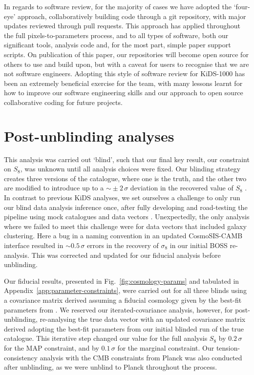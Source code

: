 \begin{appendix}
In regards to software review, for the majority of cases we have adopted the `four-eye' approach, collaboratively building code through a git repository, with major updates reviewed through pull requests.   This approach has applied throughout the full pixels-to-parameters process, and to all types of software, both our significant tools, analysis code and, for the most part, simple paper support scripts.  On publication of this paper, our repositories will become open source for others to use and build upon, but with a caveat for users to recognise that we are not software engineers.   Adopting this style of software review for KiDS-1000 has been an extremely beneficial exercise for the team, with many lessons learnt for how to improve our software engineering skills and our approach to open source collaborative coding for future projects.     

\section{Post-unblinding analyses}
\label{app:unblinding}
This analysis was carried out `blind',  such that our final key result, our constraint on $S_8$, was unknown until all analysis choices were fixed.   Our blinding strategy creates three versions of the catalogue, where one is the truth, and the other two are modified to introduce up to a $\sim\! \pm 2\,\sigma$ deviation in the recovered value of $S_8$ \citep{kuijken/etal:2015, giblin/etal:inprep}.   In contrast to previous KiDS analyses, we set ourselves a challenge to only run our blind data analysis inference once, after fully developing and road-testing the pipeline using mock catalogues and data vectors \citep{joachimi/etal:inprep}.     Unexpectedly, the only analysis where we failed to meet this challenge were for data vectors that included galaxy clustering.   Here a bug in a naming convention in an updated {\sc CosmoSIS-CAMB} interface resulted in $\sim\! 0.5\,\sigma$ errors in the recovery of $\sigma_8$ in our initial BOSS re-analysis.  This was corrected and updated for our fiducial analysis before unblinding.

Our fiducial results, presented in Fig.~\ref{fig:cosmology-params} and tabulated in Appendix~\ref{app:parameter-constraints}, were carried out for all three blinds using a covariance matrix derived assuming a fiducial cosmology given by the best-fit parameters from \citet{troester/etal:2020}.  We reserved our iterated-covariance analysis, however, for post-unblinding, re-analysing the true data vector with an updated covariance matrix derived adopting the best-fit parameters from our initial blinded run of the true catalogue.   This iterative step changed our value for the full \tttp analysis $S_8$ by $0.2\,\sigma$ for the MAP constraint, and by $0.1\, \sigma$ for the marginal constraint.   Our tension-consistency analysis with the CMB constraints from Planck was also conducted after unblinding, as we were unblind to Planck throughout the process.


\end{appendix}
